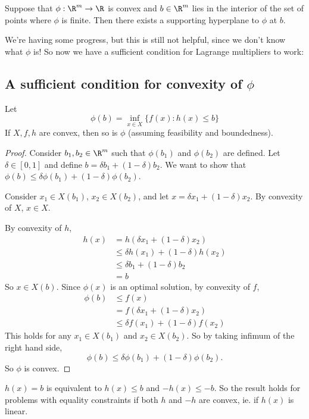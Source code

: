 \documentclass[a4paper]{article}
\begin{document}
\begin{thm}
  Suppose that $\phi: \R^m \to \R$ is convex and $b\in\R^m$ lies in the interior of the set of points where $\phi$ is finite. Then there exists a supporting hyperplane to $\phi$ at $b$.
\end{thm}

We're having some progress, but this is still not helpful, since we don't know what $\phi$ is! So now we have a sufficient condition for Lagrange multipliers to work:
\subsection{A sufficient condition for convexity of \texorpdfstring{$\phi$}{phi}}
\begin{thm}
  Let
  \[
    \phi(b) = \inf_{x\in X} \{f(x): h(x) \leq b\}
  \]
  If $X, f, h$ are convex, then so is $\phi$ (assuming feasibility and boundedness).
\end{thm}

\begin{proof}
  Consider $b_1, b_2\in \R^m$ such that $\phi(b_1)$ and $\phi(b_2)$ are defined. Let $\delta \in [0, 1]$ and define $b = \delta b_1 + (1 - \delta)b_2$. We want to show that $\phi(b) \leq \delta \phi(b_1) + (1 - \delta)\phi(b_2)$.

  Consider $x_1 \in X(b_1)$, $x_2 \in X(b_2)$, and let $x = \delta x_1 + (1 - \delta)x_2$. By convexity of $X$, $x\in X$.

  By convexity of $h$,
  \begin{align*}
    h(x) &= h(\delta x_1 + (1 - \delta) x_2)\\
    &\leq \delta h(x_1) + (1 - \delta)h(x_2)\\
    &\leq \delta b_1 + (1 - \delta)b_2\\
    &= b
  \end{align*}
  So $x\in X(b)$. Since $\phi(x)$ is an optimal solution, by convexity of $f$,
  \begin{align*}
    \phi(b) &\leq f(x)\\
    &= f(\delta x_1 + (1 - \delta) x_2)\\
    &\leq \delta f(x_1) + (1 - \delta)f(x_2)
   \end{align*}
   This holds for any $x_1\in X(b_1)$ and $x_2 \in X(b_2)$. So by taking infimum of the right hand side,
   \[
     \phi(b) \leq \delta \phi(b_1) + (1 - \delta) \phi(b_2).
   \]
   So $\phi$ is convex.
\end{proof}
$h(x) = b$ is equivalent to $h(x) \leq b$ and $-h(x) \leq -b$. So the result holds for problems with equality constraints if both $h$ and $-h$ are convex, ie. if $h(x)$ is linear.
\end{document}
